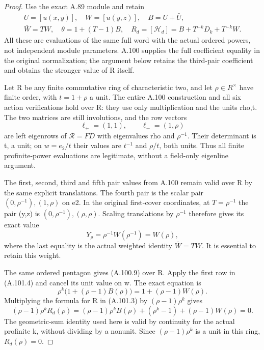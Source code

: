 \begin{proof}
Use the exact A.89 module and retain
\[
\begin{gathered}
 U=[u(x,y)],\quad W=[u(y,z)],\quad B=U+\bar U,\\
 \bar W=TW,\quad \theta=1+(T-1)B,\quad
 R_d=[\mathcal H_d]=B+T^{-k}D_k+T^{-k}W.
\end{gathered}
\tag{A.101.3}
\]
All these are evaluations of the same full word with the actual
ordered powers, not independent module parameters. A.100 supplies
the full coefficient equality in the original normalization;
the argument below retains the third-pair coefficient and obtains
the stronger value of R itself.

Let R be any finite commutative ring of characteristic two, and
let \(\rho\in R^\times\) have finite order, with
\(t=1+\rho\) a unit. The entire A.100 construction and all six
action verifications hold over R: they use only multiplication
and the units rho,t. The two matrices are still involutions, and
the row vectors
\[
 \ell_+=(1,1),\qquad \ell_-=(1,\rho)
 \tag{A.101.4}
\]
are left eigenrows of \(\mathcal R=FD\) with eigenvalues
rho and \(\rho^{-1}\). Their determinant is t, a unit; on
\(w=e_2/t\) their values are \(t^{-1}\) and \(\rho/t\), both
units. Thus all finite profinite-power evaluations are legitimate,
without a field-only eigenline argument.

The first, second, third and fifth pair values from A.100 remain
valid over R by the same explicit translations. The fourth pair
is the scalar pair \((0,\rho^{-1}),(1,\rho)\) on e2. In the
original first-cover coordinates, at \(T=\rho^{-1}\) the pair
(y,z) is \((0,\rho^{-1}),(\rho,\rho)\). Scaling translations
by \(\rho^{-1}\) therefore gives its exact value
\[
 Y_\rho=\rho^{-1}W(\rho^{-1})=W(\rho),
 \tag{A.101.5}
\]
where the last equality is the actual weighted identity
\(\bar W=TW\). It is essential to retain this weight.

The same ordered pentagon gives (A.100.9) over R. Apply the first
row in (A.101.4) and cancel its unit value on w. The exact equation is
\[
 \rho^k\bigl(1+(\rho-1)B(\rho)\bigr)
                          =1+(\rho-1)W(\rho).
 \tag{A.101.6}
\]
Multiplying the formula for R in (A.101.3) by
\((\rho-1)\rho^k\) gives
\[
 (\rho-1)\rho^k R_d(\rho)
   =(\rho-1)\rho^kB(\rho)+(\rho^k-1)
                         +(\rho-1)W(\rho)=0.
\]
The geometric-sum identity used here is valid by continuity for
the actual profinite k, without dividing by a nonunit. Since
\((\rho-1)\rho^k\) is a unit in this ring, \(R_d(\rho)=0\).


\end{proof}
